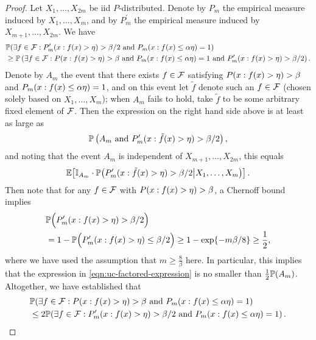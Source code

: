\begin{proof}
Let $X_{1},\ldots,X_{2m}$ be iid $P$-distributed.  Denote by $P_{m}$ the empirical measure induced by $X_{1},\ldots,X_{m}$, 
and by $P_{m}^{\prime}$ the empirical measure induced by $X_{m+1},\ldots,X_{2m}$.
We have 
\begin{align*}
& \P\!\left( \exists f \in \F : P_{m}^{\prime}( x : f(x) > \dev ) > \beta/2 \text{ and } P_{m}( x : f(x) \leq \alpha \dev ) = 1 \right)
\\ & \geq \P\left( \exists f \in \F : P( x : f(x) > \dev ) > \beta \text{ and } P_{m}( x : f(x) \leq \alpha \dev ) = 1 
\text{ and }  P_{m}^{\prime}( x : f(x) > \dev ) > \beta/2 \right).
\end{align*}
Denote by $A_{m}$ the event that there exists $f \in \F$ 
satisfying $P( x : f(x) > \dev ) > \beta$ and $P_{m}( x : f(x) \leq \alpha \dev ) = 1$, 
and on this event let $\tilde{f}$ denote such an $f \in \F$ (chosen solely based on $X_{1},\ldots,X_{m}$); 
when $A_{m}$ fails to hold, take $\tilde{f}$ to be some arbitrary fixed element of $\F$.
Then the expression on the right hand side above is at least as large as 
\begin{equation*}
\P\left( A_{m} \text{ and } P_{m}^{\prime}( x : \tilde{f}(x) > \dev ) > \beta/2 \right),
\end{equation*}
and noting that the event $A_{m}$ is independent of $X_{m+1},\ldots,X_{2m}$, this equals
\begin{equation}
\label{eqn:uc-factored-expression}
\E\!\left[ \ind_{A_{m}} \cdot \P\!\left( P_{m}^{\prime}( x : \tilde{f}(x) > \dev ) > \beta/2 \middle| X_{1},\ldots,X_{m} \right) \right].
\end{equation}
Then note that for any $f \in \F$ with $P( x : f(x) > \dev ) > \beta$, a Chernoff bound implies 
\begin{align*}
  &
  \P\Big(  P_{m}^{\prime}( x : f(x) > \dev ) > \beta/2 \Big) 
  \\ &
  = 1 - \P\Big( P_{m}^{\prime}( x : f(x) > \dev ) \leq \beta/2 \Big) 
\geq 1 - \exp\!\left\{ - m \beta / 8 \right\} 
\geq \frac{1}{2},
\end{align*}
where we have used the assumption that $m \geq \frac{8}{\beta}$ here.
In particular, this implies that the expression in \eqref{eqn:uc-factored-expression} is no smaller than 
$\frac{1}{2} \P(A_{m})$.
Altogether, we have established that 
\begin{align}
& \P\!\left( \exists f \in \F : P( x : f(x) > \dev ) > \beta \text{ and } P_{m}( x : f(x) \leq \alpha \dev ) =1 \right) \notag 
\\ & \leq 2 \P\!\left( \exists f \in \F : P_{m}^{\prime}( x : f(x) > \dev ) > \beta/2 \text{ and } P_{m}( x : f(x) \leq \alpha \dev ) = 1 \right). \label{eqn:uc-ghost-ub}
\end{align}


\end{proof}

